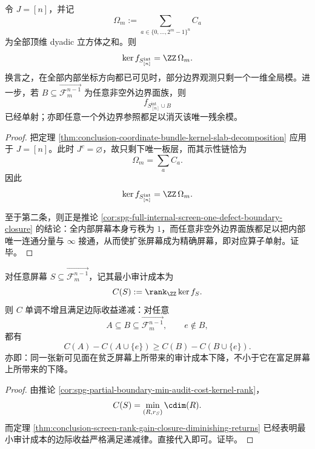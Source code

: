 \begin{theorem}[全内部可见时的唯一残余全局模]\label{thm:conclusion-full-internal-visibility-unique-global-mode}
令 \(J=[n]\)，并记
\[
\Omega_m:=\sum_{a\in \{0,\dots,2^m-1\}^n} C_a
\]
为全部顶维 dyadic 立方体之和。则
\[
\ker f_{S_{[n]}^{\mathrm{int}}}=\ZZ\,\Omega_m.
\]
换言之，在全部内部坐标方向都已可见时，部分边界观测只剩一个一维全局模。进一步，若 \(B\subseteq \overrightarrow{\mathcal F_m^{n-1}}\) 为任意非空外边界面族，则
\[
f_{S_{[n]}^{\mathrm{int}}\cup B}
\]
已经单射；亦即任意一个外边界参照都足以消灭该唯一残余模。
\end{theorem}

\begin{proof}
把定理 \ref{thm:conclusion-coordinate-bundle-kernel-slab-decomposition} 应用于 \(J=[n]\)。此时 \(J^c=\varnothing\)，故只剩下唯一板层，而其示性链恰为
\[
\Omega_m=\sum_{a} C_a.
\]
因此
\[
\ker f_{S_{[n]}^{\mathrm{int}}}=\ZZ\,\Omega_m.
\]

至于第二条，则正是推论 \ref{cor:spg-full-internal-screen-one-defect-boundary-closure} 的结论：全内部屏幕本身亏秩为 \(1\)，而任意非空外边界面族都足以把内部唯一连通分量与 \(\infty\) 接通，从而使扩张屏幕成为精确屏幕，即对应算子单射。证毕。
\end{proof}

\begin{corollary}[可见面的审计边际收益递减律]\label{cor:conclusion-screen-audit-marginal-diminishing-returns}
对任意屏幕 \(S\subseteq \overrightarrow{\mathcal F_m^{n-1}}\)，记其最小审计成本为
\[
C(S):=\rank_{\ZZ}\ker f_S.
\]
则 \(C\) 单调不增且满足边际收益递减：对任意
\[
A\subseteq B\subseteq \overrightarrow{\mathcal F_m^{n-1}},
\qquad
e\notin B,
\]
都有
\[
C(A)-C(A\cup\{e\})
\ge
C(B)-C(B\cup\{e\}).
\]
亦即：同一张新可见面在贫乏屏幕上所带来的审计成本下降，不小于它在富足屏幕上所带来的下降。
\end{corollary}

\begin{proof}
由推论 \ref{cor:spg-partial-boundary-min-audit-cost-kernel-rank}，
\[
C(S)=\min_{(R,r_S)}\cdim(R).
\]
而定理 \ref{thm:conclusion-screen-rank-gain-closure-diminishing-returns} 已经表明最小审计成本的边际收益严格满足递减律。直接代入即可。证毕。
\end{proof}

